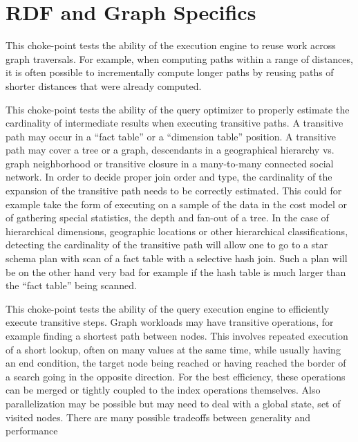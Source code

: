 


\section{RDF and Graph Specifics}


This choke-point tests the ability of the execution engine to reuse work across
graph traversals. For example, when computing paths within a range of distances,
it is often possible to incrementally compute longer paths by reusing paths of
shorter distances that were already computed.




This choke-point tests the ability of the query optimizer to properly estimate the cardinality of intermediate results when executing transitive paths. A transitive path may occur in a ``fact table'' or a ``dimension table'' position.
A transitive path may cover a tree or a graph, \eg descendants in a geographical hierarchy vs. graph neighborhood or transitive closure in a many-to-many connected social network.
In order to decide proper join order and type, the cardinality of the expansion of the transitive path needs to be correctly estimated.
This could for example take the form of executing on a sample of the data in the
cost model or of gathering special statistics, \eg the depth and fan-out of a tree. In the case of hierarchical dimensions,
\eg geographic locations or other hierarchical classifications, detecting the cardinality of the transitive path will allow one to go to a star schema plan with scan of a fact table with a selective hash join.
Such a plan will be on the other hand very bad for example if the hash table is much larger than the ``fact table'' being scanned.




This choke-point tests the ability of the query execution engine to efficiently execute transitive steps. Graph workloads may have transitive operations, for example finding a shortest path between nodes.
This involves repeated execution of a short lookup, often on many values at the
same time, while usually having an end condition, \eg the target node being reached or having reached the border of a search going in the opposite direction.
For the best efficiency, these operations can be merged or tightly coupled to
the index operations themselves. Also parallelization may be possible but may
need to deal with a global state, \eg set of visited nodes.
There are many possible tradeoffs between generality and performance

